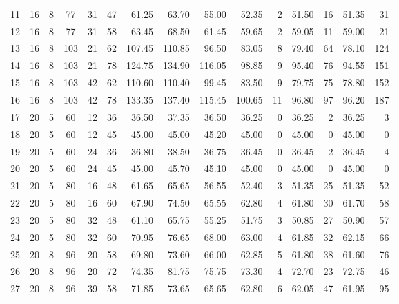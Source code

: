 \documentclass{article}
\begin{document}
\begin{table}[htbp]
\begin{tabular*}{\linewidth}{c@{\extracolsep{\fill}}@{}c@{}c@{}c@{}c@{}r@{}r@{}r@{}r@{}r@{}r@{}r@{}r@{}r@{}r}
11      & 16 & 8 & 77  & 31 & 47 & 61.25  & 63.70  & 55.00  & 52.35  & 2     & 51.50  & 16     & 51.35  & 31     \\
12      & 16 & 8 & 77  & 31 & 58 & 63.45  & 68.50  & 61.45  & 59.65  & 2     & 59.05  & 11     & 59.00  & 21     \\
13      & 16 & 8 & 103 & 21 & 62 & 107.45 & 110.85 & 96.50  & 83.05  & 8     & 79.40  & 64     & 78.10  & 124    \\
14      & 16 & 8 & 103 & 21 & 78 & 124.75 & 134.90 & 116.05 & 98.85  & 9     & 95.40  & 76     & 94.55  & 151    \\
15      & 16 & 8 & 103 & 42 & 62 & 110.60 & 110.40 & 99.45  & 83.50  & 9     & 79.75  & 75     & 78.80  & 152    \\
16      & 16 & 8 & 103 & 42 & 78 & 133.35 & 137.40 & 115.45 & 100.65 & 11    & 96.80  & 97     & 96.20  & 187    \\
17      & 20 & 5 & 60  & 12 & 36 & 36.50  & 37.35  & 36.50  & 36.25  & 0     & 36.25  & 2      & 36.25  & 3      \\
18      & 20 & 5 & 60  & 12 & 45 & 45.00  & 45.00  & 45.20  & 45.00  & 0     & 45.00  & 0      & 45.00  & 0      \\
19      & 20 & 5 & 60  & 24 & 36 & 36.80  & 38.50  & 36.75  & 36.45  & 0     & 36.45  & 2      & 36.45  & 4      \\
20      & 20 & 5 & 60  & 24 & 45 & 45.00  & 45.70  & 45.10  & 45.00  & 0     & 45.00  & 0      & 45.00  & 0      \\
21      & 20 & 5 & 80  & 16 & 48 & 61.65  & 65.65  & 56.55  & 52.40  & 3     & 51.35  & 25     & 51.35  & 52     \\
22      & 20 & 5 & 80  & 16 & 60 & 67.90  & 74.50  & 65.55  & 62.80  & 4     & 61.80  & 30     & 61.70  & 58     \\
23      & 20 & 5 & 80  & 32 & 48 & 61.10  & 65.75  & 55.25  & 51.75  & 3     & 50.85  & 27     & 50.90  & 57     \\
24      & 20 & 5 & 80  & 32 & 60 & 70.95  & 76.65  & 68.00  & 63.00  & 4     & 61.85  & 32     & 62.15  & 66     \\
25      & 20 & 8 & 96  & 20 & 58 & 69.80  & 73.60  & 66.00  & 62.85  & 5     & 61.80  & 38     & 61.60  & 76     \\
26      & 20 & 8 & 96  & 20 & 72 & 74.35  & 81.75  & 75.75  & 73.30  & 4     & 72.70  & 23     & 72.75  & 46     \\
27      & 20 & 8 & 96  & 39 & 58 & 71.85  & 73.65  & 65.65  & 62.80  & 6     & 62.05  & 47     & 61.95  & 95     \\

\end{tabular*}
\end{table}
\end{document}
